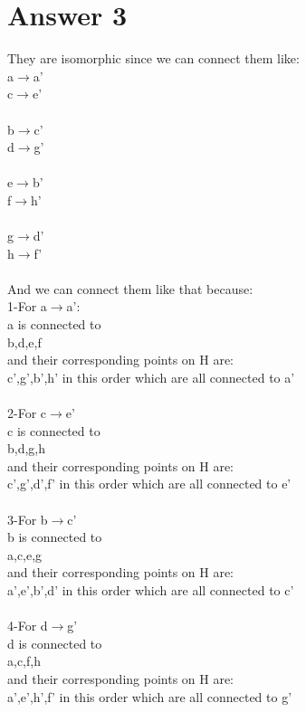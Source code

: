 \documentclass[12pt]{article}
\begin{document}
\section*{Answer 3}	
They are isomorphic since we can connect them like:\\
a$\rightarrow$a’\\
c$\rightarrow$e’\\
\\
b$\rightarrow$c’\\
d$\rightarrow$g’\\
\\
e$\rightarrow$b’\\
f$\rightarrow$h’\\
\\
g$\rightarrow$d’\\
h$\rightarrow$f’\\
\\
And we can connect them like that because:\\
1-For a$\rightarrow$a’:\\
a is connected to\\
b,d,e,f\\
and their corresponding points on H are:\\
c’,g’,b’,h’ in this order which are all connected to a’\\
\\
2-For c$\rightarrow$e’\\
c is connected to\\
b,d,g,h\\
and their corresponding points on H are:\\
c’,g’,d’,f’ in this order which are all connected to e’\\
\\
3-For b$\rightarrow$c’\\
b is connected to\\
a,c,e,g\\
and their corresponding points on H are:\\
a’,e’,b’,d’ in this order which are all connected to c’\\
\\
4-For d$\rightarrow$g’\\
d is connected to\\
a,c,f,h\\
and their corresponding points on H are:\\
a’,e’,h’,f’ in this order which are all connected to g’\\
\\
\end{document}
